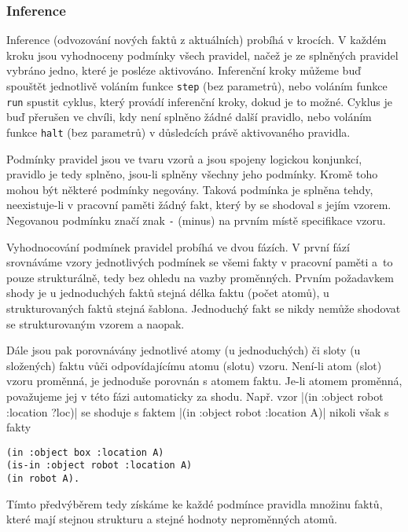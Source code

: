 \subsubsection{Inference}
\label{inference}

Inference (odvozování nových faktů z aktuálních) probíhá v krocích. V každém
kroku jsou vyhodnoceny podmínky všech pravidel, načež je ze splněných pravidel
vybráno jedno, které je posléze aktivováno. Inferenční kroky
můžeme buď spouštět jednotlivě voláním funkce \verb|step| (bez parametrů), nebo
voláním funkce \verb|run| spustit cyklus, který provádí inferenční kroky, dokud
je to možné. Cyklus je buď přerušen ve chvíli, kdy není splněno žádné
další pravidlo, nebo voláním funkce \verb|halt| (bez parametrů) v důsledcích
právě aktivovaného pravidla.

Podmínky pravidel jsou ve tvaru vzorů a jsou spojeny logickou konjunkcí,
pravidlo je tedy splněno, jsou-li splněny všechny jeho podmínky. Kromě
toho mohou být některé podmínky negovány. Taková podmínka je splněna tehdy,
neexistuje-li v pracovní paměti žádný fakt, který by se shodoval s jejím vzorem.
Negovanou podmínku značí znak \verb|-| (minus) na prvním místě specifikace vzoru.

Vyhodnocování podmínek pravidel probíhá ve dvou fázích. V první fází
srovnáváme vzory jednotlivých podmínek se všemi fakty v pracovní paměti a~to
pouze strukturálně, tedy bez ohledu na vazby proměnných. Prvním požadavkem shody
je u jednoduchých faktů stejná délka faktu (počet atomů), u strukturovaných
faktů stejná šablona. Jednoduchý fakt se nikdy nemůže shodovat se strukturovaným
vzorem a naopak.

Dále jsou pak porovnávány jednotlivé atomy (u jednoduchých) či
sloty (u složených) faktu vůči odpovídajícímu atomu (slotu) vzoru. Není-li atom
(slot) vzoru proměnná, je jednoduše porovnán s atomem faktu. Je-li atomem
proměnná, považujeme jej v této fázi automaticky za shodu. Např. vzor
\cl|(in :object robot :location ?loc)|
se shoduje s faktem
\cl|(in :object robot :location A)|
nikoli však s fakty
\begin{verbatim}
(in :object box :location A)
(is-in :object robot :location A)
(in robot A).
\end{verbatim}
Tímto předvýběrem
tedy získáme ke každé podmínce pravidla množinu faktů, které mají stejnou
strukturu a stejné hodnoty neproměnných atomů.

